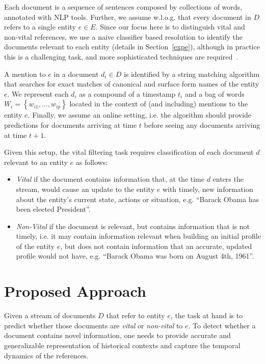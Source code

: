 \documentclass{article}
\begin{document}
Each document is a sequence of sentences composed by collections of words, annotated with NLP tools.
Further, we assume w.l.o.g. that every document in $D$ refers to a single entity $e \in E$. %
Since our focus here is to distinguish vital and non-vital references, we use a naive classifier based resolution to identify the documents relevant to each entity (details in Section~\ref{expe}), although in practice this is a challenging task, and more sophisticated techniques are required~\citep{RaoMD10,singh11:acl}.

A mention to $e$ in a document $d_i \in D$ is identified by a string matching algorithm that searches for exact matches of canonical and surface form names of the entity $e$.
We represent each $d_i$ as a compound of a timestamp $t_i$ and a bag of words $W_i = \left\{ {w_{i1}, ..., w_{ip}}\right\}$ located in the context of (and including) mentions to the entity $e$. 
Finally, we assume an online setting, i.e. the algorithm should provide predictions for documents arriving at time $t$ before seeing any documents arriving at time $t+1$.

Given this setup, the vital filtering task requires classification of each document $d$ relevant to an entity $e$ as follows:
\begin{itemize}
    \item \emph{Vital} if the document contains information that, at the time $d$ enters the stream, would cause an update to the entity $e$ with timely, new information about the entity's current state, actions or situation, e.g. ``Barack Obama has been elected President''.
    \item \emph{Non-Vital} if the document is relevant, but contains information that is not timely, i.e. it may contain information relevant when building an initial profile of the entity $e$, but does not contain information that an accurate, updated profile would not have, e.g. ``Barack Obama was born on August 4th, 1961''.
\end{itemize}

\section{Proposed Approach}
\label{approach}

Given a stream of documents $D$ that refer to entity $e$, the task at hand is to predict whether those documents are \emph{vital} or \emph{non-vital} to $e$. 
To detect whether a document contains novel information, one needs to provide accurate and generalizable representation of historical contexts and capture the temporal dynamics of the references.
\end{document}

